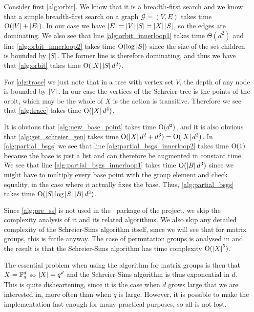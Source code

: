 Consider first \ref{alg:orbit}. We know that it is a breadth-first
search and we know that a simple breadth-first search on a graph
$\mathcal{G} = (V, E)$ takes time $\operatorname{O} ( \left\lvert V \right\rvert + \left\lvert E \right\rvert )$. In our case
we have $\left\lvert E \right\rvert = \left\lvert V \right\rvert \left\lvert S \right\rvert = \left\lvert X \right\rvert \left\lvert S \right\rvert$, so the edges
are dominating. We also see that line \ref{alg:orbit_innerloop1}
takes time $\Theta(d^2)$ and line \ref{alg:orbit_innerloop2} takes
time $\operatorname{O} ( \log{\left\lvert S \right\rvert} )$ since the size of the set
\textsf{children} is bounded by $\left\lvert S \right\rvert$. The former line is therefore dominating, and thus we have that
\ref{alg:orbit} takes time $\operatorname{O} ( \left\lvert X \right\rvert\left\lvert S \right\rvert d^2 )$.

For \ref{alg:trace} we just note that in a tree with vertex set $V$,
the depth of any node is bounded by $\left\lvert V \right\rvert$. In our case the
vertices of the Schreier tree is the points of the orbit, which may be
the whole of $X$ is the action is transitive. Therefore we see that
\ref{alg:trace} takes time $\operatorname{O} ( \left\lvert X \right\rvert d^4 )$.

It is obvious that \ref{alg:new_base_point} takes time $\operatorname{O} ( d^2 )$, and
it is also obvious that \ref{alg:get_schreier_gen} takes time
$\operatorname{O} ( \left\lvert X \right\rvert d^2 + d^3 ) = \operatorname{O} ( \left\lvert X \right\rvert d^2 )$. In \ref{alg:partial_bsgs}
we see that line \ref{alg:partial_bsgs_innerloop2} takes time $\operatorname{O} ( 1 )$
because the base is just a list and can therefore be augmented in
constant time. We see that line \ref{alg:partial_bsgs_innerloop1}
takes time $\operatorname{O} ( \left\lvert B \right\rvert d^3 )$ since we might have to multiply every
base point with the group element and check equality, in the case
where it actually fixes the base. Thus, \ref{alg:partial_bsgs} takes
time $\operatorname{O} ( \left\lvert S \right\rvert \log{\left\lvert S \right\rvert} \left\lvert B \right\rvert d^3 )$.

Since \ref{alg:pre_ss} is not used in the \GAP~package of the project,
we skip the complexity analysis of it and its related algorithms. We also skip any detailed complexity
of the Schreier-Sims algorithm itself, since we will see that for
matrix groups, this is futile anyway. The case of permutation groups is
analysed in \cite{butler91} and the result is that the Schreier-Sims
algorithm has time complexity $\operatorname{O} ( \left\lvert X \right\rvert^5 )$. 

The essential problem
when using the algorithm for matrix groups is then that $X = \mathbb{F}_q^d$
so $\left\lvert X \right\rvert = q^d$ and the Schreier-Sims algorithm is thus exponential
in $d$. This is quite disheartening, since it is the case when $d$
grows large that we are interested in, more often than when $q$ is
large. However, it is possible to make the implementation fast enough for many practical purposes, so all is not lost.


